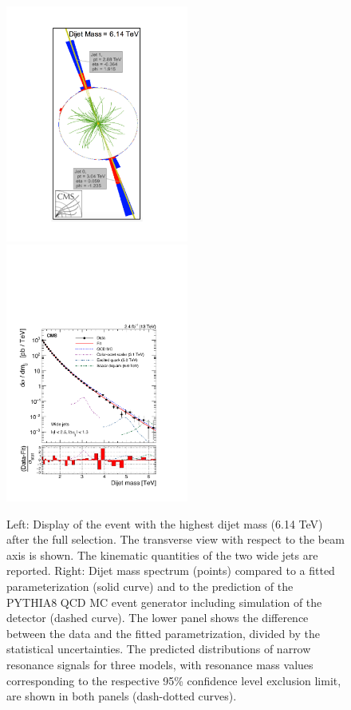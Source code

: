 \documentclass[epj]{webofc}
\begin{document}
\begin{figure}[h]
\centering
\includegraphics[width=6cm,clip]{CMS-EXO-15-001_Figure-aux_009.pdf}
\includegraphics[width=6cm,clip]{CMS-EXO-15-001_Figure_001.pdf}
\caption{Left: Display of the event with the highest dijet mass (6.14 TeV)
  after the full selection. The transverse view with respect to the
  beam axis is shown. The kinematic quantities of the two wide jets
  are reported. Right: Dijet mass spectrum (points) compared to a fitted
  parameterization (solid curve) and to the prediction 
of the PYTHIA8 QCD MC event generator including simulation of the
detector (dashed curve). The lower panel shows the difference between
the data and the fitted parametrization, divided by the statistical
uncertainties. The predicted distributions of narrow resonance signals
for three models, with resonance mass values corresponding to the
respective 95\% confidence level exclusion limit, are shown in both panels (dash-dotted curves).}
\label{dijetEventAndMass}       %
\end{figure}
\end{document}

